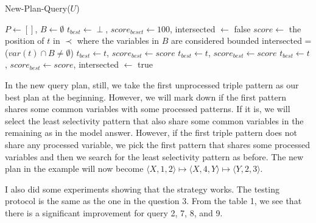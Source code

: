 \documentclass{article}
\begin{document}
\begin{enumerate}
\begin{enumerate}
\begin{algorithm}[H]
\caption{New-Plan-Query($U$)}\label{alg:greedy}
\begin{algorithmic}

\State $P \leftarrow []$, $B\leftarrow \emptyset$
\State $t_{best}\leftarrow \perp$, $score_{beset} \leftarrow 100$, intersected $\leftarrow$ false
\State $score \leftarrow$ the position of $t$ in $\prec$ where the variables in $B$ are considered bounded
\State intersected = ($var(t) \cap B \neq \emptyset$)
\State $t_{best} \leftarrow t$, $score_{best} \leftarrow score$
\State $t_{best} \leftarrow t$, $score_{best} \leftarrow score$
\EndIf
\Else
{} 
\State $t_{best} \leftarrow t$, $score_{best} \leftarrow score$, intersected $\leftarrow$ true
\EndIf
\EndIf

\EndFor
\EndWhile

\end{algorithmic}
\end{algorithm}

In the new query plan, still, we take the first unprocessed triple pattern as our best plan at the beginning. However, we will mark down if the first pattern shares some common variables with some processed patterns. If it is, we will select the least selectivity pattern that also share some common variables in the remaining as in the model answer. However, if the first triple pattern does not share any processed variable, we pick the first pattern that shares some processed variables and then we search for the least selectivity pattern as before. The new plan in the example will now become $\langle X, 1, 2\rangle \mapsto \langle X, 4, Y\rangle \mapsto \langle Y, 2, 3\rangle$. 

I also did some experiments showing that the strategy works. The testing protocol is the same as the one in the question 3. From the table 1, we see that there is a significant improvement for query 2, 7, 8, and 9. 


\end{enumerate}
\end{enumerate}
\end{document}
